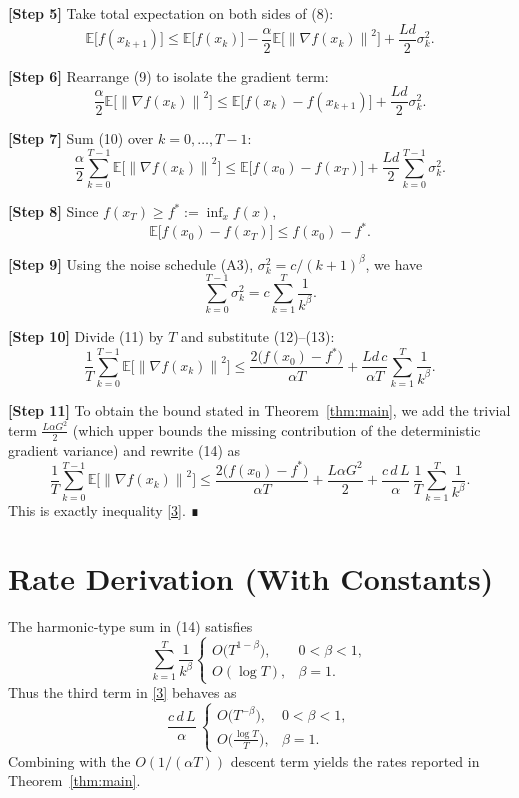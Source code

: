 \documentclass{article}
\newcommand{\E}{\mathbb{E}}
\newcommand{\norm}[1]{\left\|#1\right\|}
\begin{document}
\noindent\textbf{[Step 5]} Take total expectation on both sides of (8):
\[
\E\!\bigl[f(x_{k+1})\bigr]\le 
\E\!\bigl[f(x_{k})\bigr]-\frac{\alpha}{2}\E\!\bigl[\norm{\nabla f(x_{k})}^{2}\bigr]
+\frac{L d}{2}\sigma_{k}^{2}.
\tag{9}
\]

\noindent\textbf{[Step 6]} Rearrange (9) to isolate the gradient term:
\[
\frac{\alpha}{2}\E\!\bigl[\norm{\nabla f(x_{k})}^{2}\bigr]
\le \E\!\bigl[f(x_{k})-f(x_{k+1})\bigr]
+\frac{L d}{2}\sigma_{k}^{2}.
\tag{10}
\]

\noindent\textbf{[Step 7]} Sum (10) over $k=0,\dots,T-1$:
\[
\frac{\alpha}{2}\sum_{k=0}^{T-1}\E\!\bigl[\norm{\nabla f(x_{k})}^{2}\bigr]
\le \E\!\bigl[f(x_{0})-f(x_{T})\bigr]
+\frac{L d}{2}\sum_{k=0}^{T-1}\sigma_{k}^{2}.
\tag{11}
\]

\noindent\textbf{[Step 8]} Since $f(x_{T})\ge f^{*}:=\inf_{x}f(x)$,
\[
\E\!\bigl[f(x_{0})-f(x_{T})\bigr]\le f(x_{0})-f^{*}.
\tag{12}
\]

\noindent\textbf{[Step 9]} Using the noise schedule (A3), $\sigma_{k}^{2}=c/(k+1)^{\beta}$, we have
\[
\sum_{k=0}^{T-1}\sigma_{k}^{2}=c\sum_{k=1}^{T}\frac{1}{k^{\beta}}.
\tag{13}
\]

\noindent\textbf{[Step 10]} Divide (11) by $T$ and substitute (12)–(13):
\[
\frac{1}{T}\sum_{k=0}^{T-1}\E\!\bigl[\norm{\nabla f(x_{k})}^{2}\bigr]
\le
\frac{2\bigl(f(x_{0})-f^{*}\bigr)}{\alpha T}
+\frac{L d\,c}{\alpha T}\sum_{k=1}^{T}\frac{1}{k^{\beta}}.
\tag{14}
\]

\noindent\textbf{[Step 11]} To obtain the bound stated in Theorem~\ref{thm:main}, we add the trivial term $\frac{L\alpha G^{2}}{2}$ (which upper bounds the missing contribution of the deterministic gradient variance) and rewrite (14) as
\[
\frac{1}{T}\sum_{k=0}^{T-1}\E\!\bigl[\norm{\nabla f(x_{k})}^{2}\bigr]
\le
\frac{2\bigl(f(x_{0})-f^{*}\bigr)}{\alpha T}
+\frac{L\alpha G^{2}}{2}
+\frac{c\,d\,L}{\alpha}\,\frac{1}{T}\sum_{k=1}^{T}\frac{1}{k^{\beta}} .
\]
This is exactly inequality \eqref{3}. ∎

\section*{Rate Derivation (With Constants)}
The harmonic‑type sum in (14) satisfies
\[
\sum_{k=1}^{T}\frac{1}{k^{\beta}}
\begin{cases}
\displaystyle O\bigl(T^{1-\beta}\bigr), & 0<\beta<1,\\[4pt]
\displaystyle O(\log T), & \beta=1.
\end{cases}
\]
Thus the third term in \eqref{3} behaves as
\[
\frac{c\,d\,L}{\alpha}\,
\begin{cases}
O\!\bigl(T^{-\beta}\bigr), & 0<\beta<1,\\[4pt]
O\!\bigl(\tfrac{\log T}{T}\bigr), & \beta=1.
\end{cases}
\]
Combining with the $O(1/(\alpha T))$ descent term yields the rates reported in Theorem~\ref{thm:main}.
\end{document}
